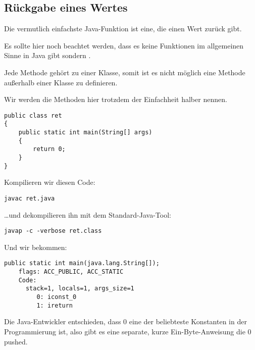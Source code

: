 \subsection{Rückgabe eines Wertes}

Die vermutlich einfachste Java-Funktion ist eine, die einen Wert zurück gibt.

Es sollte hier noch beachtet werden, dass es keine  Funktionen im
allgemeinen Sinne in Java gibt sondern . 

Jede Methode gehört zu einer Klasse, somit ist es nicht möglich eine Methode
außerhalb einer Klasse zu definieren.

Wir werden die Methoden hier trotzdem der Einfachheit halber  nennen.

\begin{lstlisting}[style=customjava]
public class ret
{
	public static int main(String[] args) 
	{
		return 0;
	}
}
\end{lstlisting}

Kompilieren wir diesen Code:

\begin{lstlisting}
javac ret.java
\end{lstlisting}

\dots und dekompilieren ihn mit dem Standard-Java-Tool:

\begin{lstlisting}
javap -c -verbose ret.class
\end{lstlisting}

Und wir bekommen:

\begin{lstlisting}[caption=JDK 1.7 (excerpt)]
  public static int main(java.lang.String[]);
    flags: ACC_PUBLIC, ACC_STATIC
    Code:
      stack=1, locals=1, args_size=1
         0: iconst_0      
         1: ireturn       
\end{lstlisting}

Die Java-Entwickler entschieden, dass 0 eine der beliebteste Konstanten in der
Programmierung ist, also gibt es eine separate, kurze Ein-Byte-Anweisung die
0 pushed.

